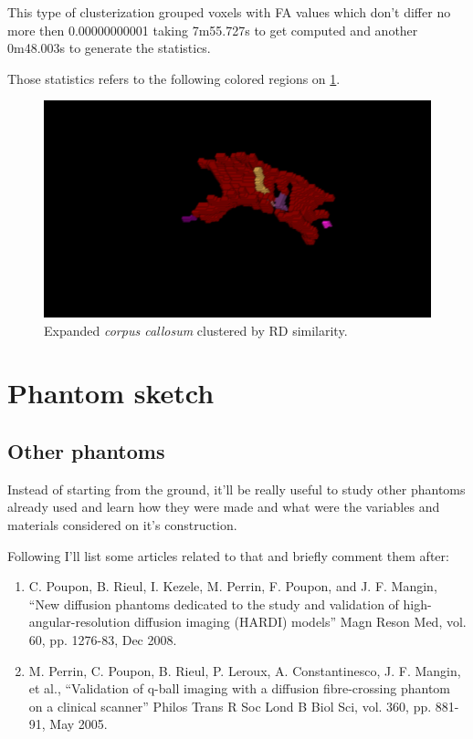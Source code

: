 \documentclass[a4paper,11pt]{report}
\begin{document}
    This type of clusterization grouped voxels with FA values which don't differ no more then 0.00000000001 taking 7m55.727s to get computed and another 0m48.003s to generate the statistics.

    Those statistics refers to the following colored regions on \ref{fig:tv-regions}.

    \begin{figure}[!ht]
      \includegraphics[width=1\linewidth]{img/regions/tv_regions.png}
      \caption{Expanded \textit{corpus callosum} clustered by RD similarity.}
      \label{fig:tv-regions}
    \end{figure}

\section{Phantom sketch}
  \subsection{Other phantoms}\label{subsec:other-phantoms}
  Instead of starting from the ground, it'll be really useful to study other phantoms already used and learn how they were made and what were the variables and materials considered on it's construction.

  Following I'll list some articles related to that and briefly comment them after:

  \begin{enumerate}
    \item C. Poupon, B. Rieul, I. Kezele, M. Perrin, F. Poupon, and J. F. Mangin, ``New diffusion phantoms dedicated to the study and validation of high-angular-resolution diffusion imaging (HARDI) models'' Magn Reson Med, vol. 60, pp. 1276-83, Dec 2008.
    \item M. Perrin, C. Poupon, B. Rieul, P. Leroux, A. Constantinesco, J. F. Mangin, et al., ``Validation of q-ball imaging with a diffusion fibre-crossing phantom on a clinical scanner'' Philos Trans R Soc Lond B Biol Sci, vol. 360, pp. 881-91, May 2005.
  \end{enumerate}
\end{document}
